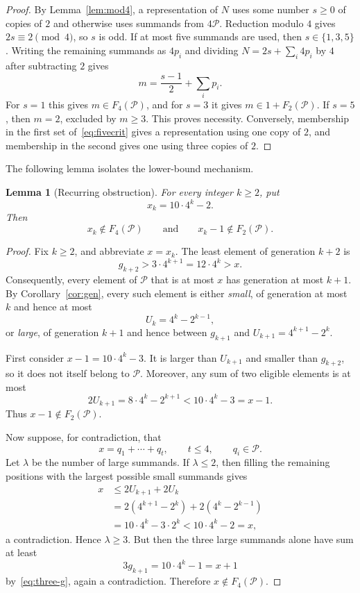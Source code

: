 \documentclass[12pt]{article}
\theoremstyle{plain}
\newtheorem{lemma}[theorem]{Lemma}
\theoremstyle{definition}
\theoremstyle{plain}
\newcommand{\Pset}{\mathcal{P}}
\begin{document}
\begin{proof}
By Lemma~\ref{lem:mod4}, a representation of $N$ uses some number $s\geq0$ of
copies of $2$ and otherwise uses summands from $4\Pset$.  Reduction modulo $4$
gives $2s\equiv2\pmod4$, so $s$ is odd.  If at most five summands are used,
then $s\in\{1,3,5\}$.  Writing the remaining summands as $4p_i$ and dividing
$N=2s+\sum_i4p_i$ by $4$ after subtracting $2$ gives
\[
  m=\frac{s-1}{2}+\sum_i p_i.
\]
For $s=1$ this gives $m\in F_4(\Pset)$, and for $s=3$ it gives
$m\in1+F_2(\Pset)$.  If $s=5$, then $m=2$, excluded by $m\geq3$.  This proves
necessity.  Conversely, membership in the first set of~\eqref{eq:fivecrit}
gives a representation using one copy of $2$, and membership in the second
gives one using three copies of $2$.
\end{proof}

The following lemma isolates the lower-bound mechanism.

\begin{lemma}[Recurring obstruction]\label{lem:obstruction}
For every integer $k\geq2$, put
\[
  x_k=10\cdot4^k-2.
\]
Then
\begin{equation}\label{eq:obstruction}
  x_k\notin F_4(\Pset)
  \qquad\text{and}\qquad
  x_k-1\notin F_2(\Pset).
\end{equation}
\end{lemma}

\begin{proof}
Fix $k\geq2$, and abbreviate $x=x_k$.  The least element of generation $k+2$
is
\[
  g_{k+2}>3\cdot4^{k+1}=12\cdot4^k>x.
\]
Consequently, every element of $\Pset$ that is at most $x$ has generation at
most $k+1$.  By Corollary~\ref{cor:gen}, every such element is either
\emph{small}, of generation at most $k$ and hence at most
\[
  U_k=4^k-2^{k-1},
\]
or \emph{large}, of generation $k+1$ and hence between $g_{k+1}$ and
$U_{k+1}=4^{k+1}-2^k$.

First consider $x-1=10\cdot4^k-3$.  It is larger than $U_{k+1}$ and smaller
than $g_{k+2}$, so it does not itself belong to $\Pset$.  Moreover, any sum of
two eligible elements is at most
\[
  2U_{k+1}=8\cdot4^k-2^{k+1}<10\cdot4^k-3=x-1.
\]
Thus $x-1\notin F_2(\Pset)$.

Now suppose, for contradiction, that
\[
  x=q_1+\cdots+q_t,\qquad t\leq4,\qquad q_i\in\Pset.
\]
Let $\lambda$ be the number of large summands.  If $\lambda\leq2$, then filling
the remaining positions with the largest possible small summands gives
\begin{align*}
  x
  &\leq2U_{k+1}+2U_k\\
  &=2(4^{k+1}-2^k)+2(4^k-2^{k-1})\\
  &=10\cdot4^k-3\cdot2^k
  <10\cdot4^k-2=x,
\end{align*}
a contradiction.  Hence $\lambda\geq3$.  But then the three large summands
alone have sum at least
\[
  3g_{k+1}=10\cdot4^k-1=x+1
\]
by~\eqref{eq:three-g}, again a contradiction.  Therefore
$x\notin F_4(\Pset)$.
\end{proof}
\end{document}
